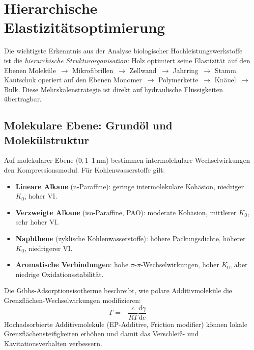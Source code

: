 ﻿\documentclass[a4paper,12pt]{scrreprt}
\theoremstyle{definition}
\begin{document}
\section{Hierarchische Elastizitätsoptimierung}

Die wichtigste Erkenntnis aus der Analyse biologischer Hochleistungswerkstoffe
ist die \emph{hierarchische Strukturorganisation}: Holz optimiert seine
Elastizität auf den Ebenen Moleküle~$\to$ Mikrofibrillen~$\to$ Zellwand~$\to$
Jahrring~$\to$ Stamm. Kautschuk operiert auf den Ebenen Monomer~$\to$
Polymerkette~$\to$ Knäuel~$\to$ Bulk. Diese Mehrskalenstrategie ist direkt
auf hydraulische Flüssigkeiten übertragbar.

\subsection{Molekulare Ebene: Grundöl und Molekülstruktur}

Auf molekularer Ebene ($0{,}1$--$1\,\mathrm{nm}$) bestimmen
intermolekulare Wechselwirkungen den Kompressionsmodul. Für
Kohlenwasserstoffe gilt:

\begin{itemize}
  \item \textbf{Lineare Alkane} (n-Paraffine): geringe intermolekulare
    Kohäsion, niedriger $K_0$, hoher VI.
  \item \textbf{Verzweigte Alkane} (iso-Paraffine, PAO): moderate Kohäsion,
    mittlerer $K_0$, sehr hoher VI.
  \item \textbf{Naphthene} (zyklische Kohlenwasserstoffe): höhere Packungsdichte,
    höherer $K_0$, niedrigerer VI.
  \item \textbf{Aromatische Verbindungen}: hohe $\pi$-$\pi$-Wechselwirkungen,
    hoher $K_0$, aber niedrige Oxidationsstabilität.
\end{itemize}

Die Gibbs-Adsorptionsisotherme beschreibt, wie polare Additivmoleküle
die Grenzflächen-Wechselwirkungen modifizieren:
\begin{equation}
  \Gamma = -\frac{c}{RT} \frac{\mathrm{d}\gamma}{\mathrm{d}c}
  \label{eq:gibbs_adsorption}
\end{equation}
Hochadsorbierte Additivmoleküle (EP-Additive, Friction modifier) können
lokale Grenzflächensteifigkeiten erhöhen und damit das Verschleiß- und
Kavitationsverhalten verbessern.
\end{document}

